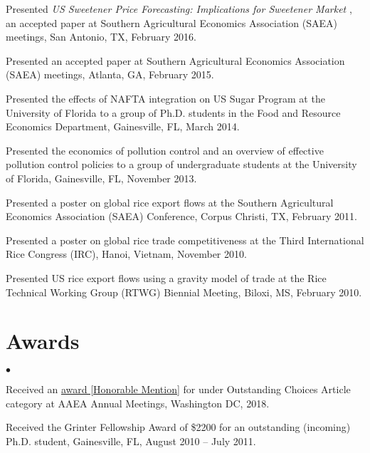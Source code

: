 \documentclass[margin,line]{res}
\newenvironment{list2}{
  \begin{list}{$\bullet$}{%
    \setlength{\itemsep}{0in}
    \setlength{\parsep}{0in} \setlength{\parskip}{0in}
    \setlength{\topsep}{0in} \setlength{\partopsep}{0in}
    \setlength{\leftmargin}{0.2in}}}{\end{list}}
\begin{document}
\begin{resume}
\begin{etaremune}
\item Presented \textit{US Sweetener Price Forecasting: Implications for Sweetener Market }, an accepted paper at Southern Agricultural Economics Association (SAEA) meetings, San Antonio, TX, February 2016.
\item Presented an accepted paper at Southern Agricultural Economics Association (SAEA) meetings, Atlanta, GA, February 2015.
\item Presented the effects of NAFTA integration on US Sugar Program at the University of Florida to a group of Ph.D. students in the Food and Resource Economics Department, Gainesville, FL, March 2014.
\item Presented the economics of pollution control and an overview of effective pollution control policies to a group of undergraduate students at the University of Florida, Gainesville, FL, November 2013.
\item Presented a poster on global rice export flows at the Southern Agricultural Economics Association (SAEA) Conference, Corpus Christi, TX, February 2011.
\item Presented a poster on global rice trade competitiveness at the Third International Rice Congress (IRC), Hanoi, Vietnam, November 2010.
\item Presented US rice export flows using a gravity model of trade at the Rice Technical Working Group (RTWG) Biennial Meeting, Biloxi, MS, February 2010.
\end{etaremune}

\section{\sc Awards}
\begin{list2}
\item Received an \href{https://www.aaea.org/about-aaea/awards-and-honors/aaea-annual-awards/aaea-annual-award-winners/2018-aaea-annual-award-winners}{award [Honorable Mention]} for \href{http://www.choicesmagazine.org/choices-magazine/submitted-articles/sweeteners-may-leave-a-sour-note-on-nafta-renegotiations}{} under Outstanding Choices Article category at AAEA Annual Meetings, Washington DC, 2018. 
\item Received the Grinter Fellowship Award of \$2200 for an outstanding (incoming) Ph.D. student, Gainesville, FL, August 2010 -- July 2011.
\end{list2}


\end{resume}
\end{document}
